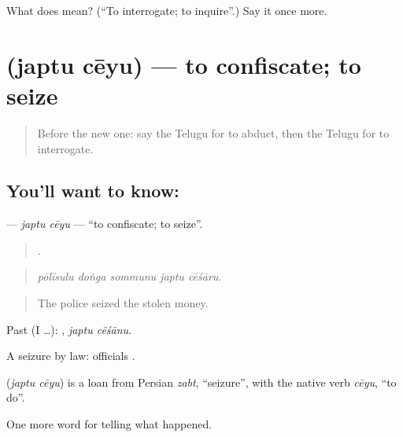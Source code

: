 \begin{tcolorbox}[breakable,colback=teal!4,colframe=teal!35!black,title={Before you move on}]
What does  mean? (\textquotedblleft{}To interrogate; to inquire\textquotedblright{}.) Say it once more.
\end{tcolorbox}
\section[\texorpdfstring{\te{జప్తు} \te{చేయు} (japtu cēyu)}{జప్తు చేయు (japtu cēyu)}]{  (japtu cēyu) — to confiscate; to seize}

\label{lesson:TE-C381-japtu-ceyu}



\begin{quote}
Before the new one: say the Telugu for to abduct, then the Telugu for to interrogate.
\end{quote}

\subsection*{You'll want to know:  }
\textbf{ } — \emph{japtu cēyu} — \textquotedblleft{}to confiscate; to seize\textquotedblright{}.

\begin{quote}
    .
\end{quote}

\begin{quote}
\emph{pōlīsulu doṅga sommunu japtu cēśāru.}
\end{quote}

\begin{quote}
The police seized the stolen money.
\end{quote}

Past (I …):  , \emph{japtu cēśānu}.

A seizure by law: officials  .

\begin{cousinweb}
\textbf{ } (\emph{japtu cēyu}) is a loan from Persian \emph{zabt}, \textquotedblleft{}seizure\textquotedblright{}, with the native verb \emph{cēyu}, \textquotedblleft{}to do\textquotedblright{}.
\end{cousinweb}

\begin{grammarlens}[title={What you've built}]
One more word for telling what happened.
\end{grammarlens}

